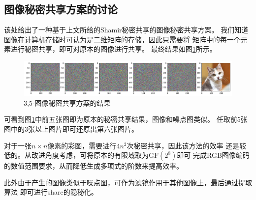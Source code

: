 \subsection{图像秘密共享方案的讨论}

该处给出了一种基于上文所给的Shamir秘密共享的图像秘密共享方案。
我们知道图像在计算机存储时可认为是二维矩阵的存储，因此只需要将
矩阵中的每一个元素进行秘密共享，即可对原本的图像进行共享。
最终结果如图\ref{fig:shamir_3}所示。

\begin{figure}[!htbp]
    \centering
    \includegraphics[width=1\textwidth]{figures/shamir_3.png}
    \caption{3,5-图像秘密共享方案的结果}
    \label{fig:shamir_3}
\end{figure}

可看到图\ref{fig:shamir_3}中前五张图即为原本的秘密共享结果，图像和噪点图类似。
任取前5张图中的3张以上图片即可还原出第六张图片。

对于一张$n\times n$像素的彩图，需要进行$4n^2$次秘密共享，因此该方法的效率
还是较低的。从改进角度考虑，可将原本的有限域取为$\mathrm{GF}(2^8)$即可
完成RGB图像编码的数值范围要求，从而降低生成多项式的阶数来提高效率。

此外由于产生的图像类似于噪点图，可作为滤镜作用于其他图像上，最后通过提取算法
即可进行share的隐秘化。